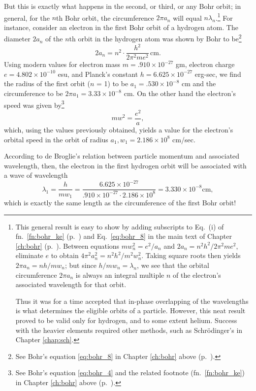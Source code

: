 But this is exactly what happens in the second, or third, or any Bohr
orbit; in general, for the $n$th Bohr orbit, the circumference
$2\pi a_n$ will equal $n\lambda_n$.\footnote{This general result is easy to show
  by adding subscripts to Eq.~(i) of fn.~\ref{fn:bohr_ke} (p.~\pageref{fn:bohr_ke}) and
  Eq.~\eqref{eq:bohr_8} in the main text of Chapter \ref{ch:bohr} (p.~\pageref{eq:bohr_8}). 
  Between equations 
  $mw_n^2 = e^2/a_n$ and $2a_n = n^2h^2/2\pi^2me^2$,  eliminate $e$ to obtain
  $4\pi^2a_n^2 = n^2h^2/m^2w_n^2$. Taking
  square roots then yields $2\pi a_n = nh/mw_n$;
  but since $h/mw_n = \lambda_n$, we see
  that the orbital circumference $2\pi a_n$ is always
  an integral multiple $n$ of the electron's associated wavelength
  for that orbit.

  Thus it was for a time accepted that in-phase overlapping of the
  wavelengths is what determines the eligible orbits of a particle.
  However, this neat result proved to be valid only for hydrogen, and to
  some extent helium. Success with the heavier elements required other
  methods, such as Schrödinger's in Chapter \ref{chap:sch}.} For instance, consider an
electron in the first Bohr orbit of a hydrogen atom. The diameter
$2a_n$ of the $n$th orbit in the hydrogen atom
was shown by Bohr to be\footnote{See Bohr's equation \eqref{eq:bohr_8} in Chapter
\ref{ch:bohr} above (p.~\pageref{eq:bohr_8}).}
%
\begin{equation*}
2a_n = n^2 \cdot \frac{h^2}{2\pi^2me^2}\, \text{cm.}
\end{equation*}
%
Using modern values for electron mass $m = .910\times 10^{-27}$ gm,
electron charge $e = 4.802\times 10^{-10}$ esu, and Planck's constant
$h = 6.625\times 10^{-27}$ erg-sec, we find the radius of the first orbit
($n$ = 1) to be $a_1 = .530\times 10^{-8}$ cm and the
circumference to be $2\pi a_1 = 3.33\times 10^{-8}$ cm. On the
other hand the electron's speed was given by\footnote{See Bohr's
  equation \eqref{eq:bohr_4} and the related footnote (fn.~\ref{fn:bohr_ke})
   in Chapter \ref{ch:bohr} above
  (p.~\pageref{eq:bohr_4}).}
%
\begin{equation*}
mw^2 = \frac{e^2}{a} ,
%
\end{equation*}
which, using the values previously obtained, yields a value for the
electron's orbital speed in the orbit of radius
$a_1, w_1 = 2.186\times 10^8$ cm/sec.

According to de Broglie's relation between particle momentum and
associated wavelength, then, the electron in the first hydrogen orbit
will be associated with a wave of wavelength
\begin{equation*}
\lambda_1 = \frac{h}{mw_1} = \frac{6.625\times 10^{-27}}{.910\times 10^{-27}\cdot2.186\times 10^8}
 = 3.330\times 10^{-8} \text{cm},
\end{equation*}
which is exactly the same length as the circumference of the first Bohr orbit!


